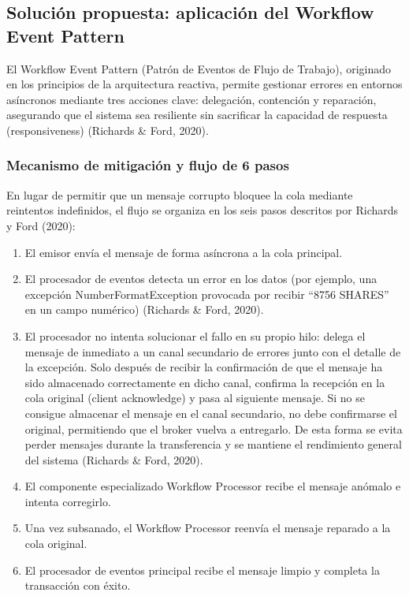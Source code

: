 \documentclass[12pt, a4paper]{article}
\begin{document}
    \subsection{Solución propuesta: aplicación del Workflow Event Pattern}
El Workflow Event Pattern (Patrón de Eventos de Flujo de Trabajo), originado en los principios de la arquitectura reactiva, permite gestionar errores en entornos asíncronos mediante tres acciones clave: delegación, contención y reparación, asegurando que el sistema sea resiliente sin sacrificar la capacidad de respuesta (responsiveness) (Richards \& Ford, 2020).
    \subsubsection{Mecanismo de mitigación y flujo de 6 pasos}
En lugar de permitir que un mensaje corrupto bloquee la cola mediante reintentos indefinidos, el flujo se organiza en los seis pasos descritos por Richards y Ford (2020):

    \begin{enumerate}
    \item El emisor envía el mensaje de forma asíncrona a la cola principal.
    \item El procesador de eventos detecta un error en los datos (por ejemplo, una excepción NumberFormatException provocada por recibir ``8756 SHARES'' en un campo numérico) (Richards \& Ford, 2020).
    \item El procesador no intenta solucionar el fallo en su propio hilo: delega el mensaje de inmediato a un canal secundario de errores junto con el detalle de la excepción. Solo después de recibir la confirmación de que el mensaje ha sido almacenado correctamente en dicho canal, confirma la recepción en la cola original (client acknowledge) y pasa al siguiente mensaje. Si no se consigue almacenar el mensaje en el canal secundario, no debe confirmarse el original, permitiendo que el broker vuelva a entregarlo. De esta forma se evita perder mensajes durante la transferencia y se mantiene el rendimiento general del sistema (Richards \& Ford, 2020).
    \item El componente especializado Workflow Processor recibe el mensaje anómalo e intenta corregirlo.
    \item Una vez subsanado, el Workflow Processor reenvía el mensaje reparado a la cola original.
    \item El procesador de eventos principal recibe el mensaje limpio y completa la transacción con éxito.
    \end{enumerate}
\end{document}
